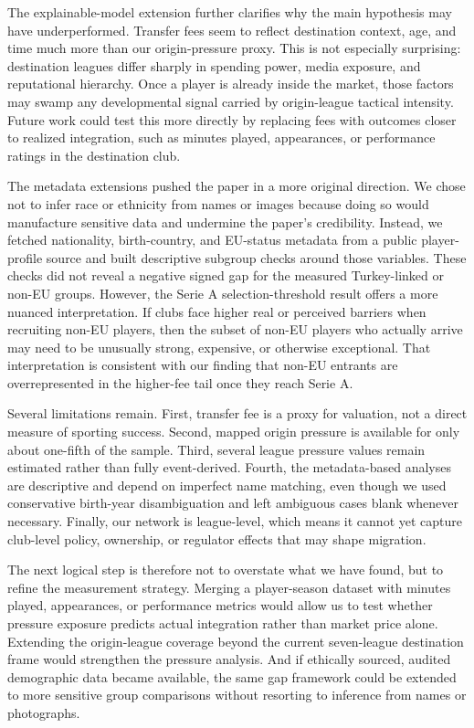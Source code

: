 \documentclass[12pt]{article}
\begin{document}
The explainable-model extension further clarifies why the main hypothesis may have underperformed. Transfer fees seem to reflect destination context, age, and time much more than our origin-pressure proxy. This is not especially surprising: destination leagues differ sharply in spending power, media exposure, and reputational hierarchy. Once a player is already inside the market, those factors may swamp any developmental signal carried by origin-league tactical intensity. Future work could test this more directly by replacing fees with outcomes closer to realized integration, such as minutes played, appearances, or performance ratings in the destination club.

The metadata extensions pushed the paper in a more original direction. We chose not to infer race or ethnicity from names or images because doing so would manufacture sensitive data and undermine the paper's credibility. Instead, we fetched nationality, birth-country, and EU-status metadata from a public player-profile source and built descriptive subgroup checks around those variables. These checks did not reveal a negative signed gap for the measured Turkey-linked or non-EU groups. However, the Serie A selection-threshold result offers a more nuanced interpretation. If clubs face higher real or perceived barriers when recruiting non-EU players, then the subset of non-EU players who actually arrive may need to be unusually strong, expensive, or otherwise exceptional. That interpretation is consistent with our finding that non-EU entrants are overrepresented in the higher-fee tail once they reach Serie A.

Several limitations remain. First, transfer fee is a proxy for valuation, not a direct measure of sporting success. Second, mapped origin pressure is available for only about one-fifth of the sample. Third, several league pressure values remain estimated rather than fully event-derived. Fourth, the metadata-based analyses are descriptive and depend on imperfect name matching, even though we used conservative birth-year disambiguation and left ambiguous cases blank whenever necessary. Finally, our network is league-level, which means it cannot yet capture club-level policy, ownership, or regulator effects that may shape migration.

The next logical step is therefore not to overstate what we have found, but to refine the measurement strategy. Merging a player-season dataset with minutes played, appearances, or performance metrics would allow us to test whether pressure exposure predicts actual integration rather than market price alone. Extending the origin-league coverage beyond the current seven-league destination frame would strengthen the pressure analysis. And if ethically sourced, audited demographic data became available, the same gap framework could be extended to more sensitive group comparisons without resorting to inference from names or photographs.
\end{document}
